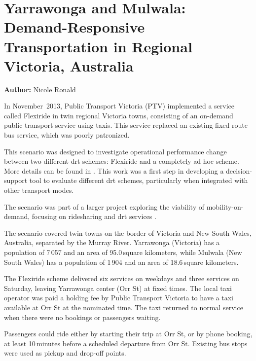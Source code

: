 \chapter{Yarrawonga and Mulwala: Demand-Responsive Transportation in Regional Victoria, Australia}
\label{ch:yarrawonga}
\hfill \textbf{Author:} Nicole Ronald


In November~2013, Public Transport Victoria (PTV) implemented a service called
Flexiride in twin regional Victoria towns, consisting of an on-demand public
transport service using taxis. This service replaced an existing fixed-route bus
service, which was poorly patronized.

This scenario was designed to investigate operational performance change  
 between two different \gls{drt} schemes: Flexiride and a
completely ad-hoc scheme. More details can be found in
\citep[][]{RonThoWin2015}. This work was a first step in developing a
decision-support tool to evaluate different \gls{drt} schemes, particularly when
integrated with other transport modes. 

The scenario was part of a larger project exploring the viability of
mobility-on-demand, focusing on ridesharing and \gls{drt} services \citep[][]{Ronald_iMoD_2014}.

The scenario covered twin towns on the border of Victoria and New South Wales,
Australia, separated by the Murray River. Yarrawonga (Victoria) has a population
of 7\,057 and an area of 95.0\,square kilometers, while Mulwala (New South Wales) has a
population of 1\,904 and an area of 18.6\,square kilometers. 

The Flexiride scheme delivered six services on weekdays and three services on
Saturday, leaving Yarrawonga center (Orr St) at fixed times. The local
taxi operator was paid a holding fee by Public Transport Victoria to have a taxi available at
Orr St at the nominated time. The taxi returned to normal service when there were no
bookings or passengers waiting.

Passengers could ride either by starting their trip at Orr St, or by phone booking, at least 10\,minutes before a scheduled departure from Orr St. Existing bus stops were used as pickup and drop-off
points.


